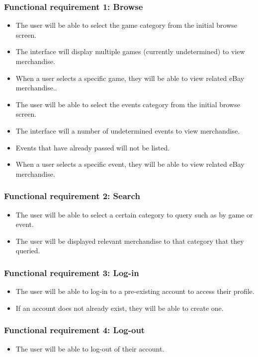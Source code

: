 \documentclass[onecolumn, draftclsnofoot,10pt, compsoc]{IEEEtran}
\begin{document}
\subsubsection{Functional requirement 1: Browse}
\begin{itemize}
\item The user will be able to select the game category from the initial browse screen.
\item The interface will display multiple games (currently undetermined) to view merchandise.
\item When a user selects a specific game, they will be able to view related eBay merchandise..
\item The user will be able to select the events category from the initial browse screen.
\item The interface will a number of undetermined events to view merchandise.
\item Events that have already passed will not be listed.
\item When a user selects a specific event, they will be able to view related eBay merchandise.
\end{itemize}

\subsubsection{Functional requirement 2: Search}
\begin{itemize}
\item The user will be able to select a certain category to query such as by game or event.
\item The user will be displayed relevant merchandise to that category that they queried.
\end{itemize}

\subsubsection{Functional requirement 3: Log-in}
\begin{itemize}
\item The user will be able to log-in to a pre-existing account to access their profile.
\item If an account does not already exist, they will be able to create one.
\end{itemize}

\subsubsection{Functional requirement 4: Log-out}
\begin{itemize}
\item The user will be able to log-out of their account.
\end{itemize}
\end{document}
